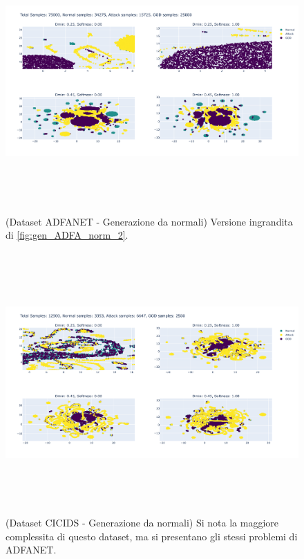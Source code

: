 \begin{figure}[htpb]
    \centering
    \includegraphics[width=\textwidth,height=10cm,keepaspectratio=true]{img/gen_test/adfa/ADFANET_normal_only_25k_ood_zoomed.png}
    \caption{
      (Dataset ADFANET - Generazione da normali) Versione ingrandita di \ref{fig:gen_ADFA_norm_2}.
    }
    \label{fig:gen_ADFA_norm_2_zoomed}
\end{figure}


\begin{figure}[htpb]
    \centering
    \includegraphics[width=\textwidth,height=10cm,keepaspectratio=true]{img/gen_test/cicids/CICIDS18_normal_only_25p_ood.png}
    \caption{
      (Dataset CICIDS - Generazione da normali) Si nota la maggiore complessita di questo dataset, ma si presentano gli stessi problemi di ADFANET.
    }
    \label{fig:gen_CICIDS_norm_1}
\end{figure}


